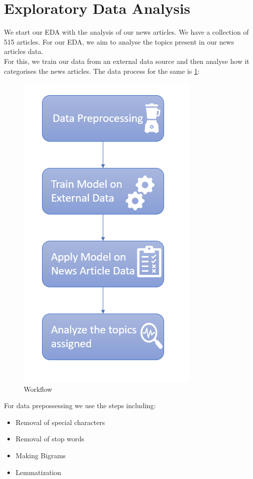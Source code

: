 \documentclass{article}
\begin{document}
\section{Exploratory Data Analysis}

We start our EDA with the analysis of our news articles. We have a collection of 515 articles. For our EDA, we aim to analyse the topics present in our news articles data. \\
 For this, we train our data from an external data source\cite{allnewsdata} and then analyse how it categorises the news articles. The data process for the same is \ref{Workflow}: \\

\begin{figure}
\centering
\includegraphics[scale=0.6]{lda_eda_process.PNG}
\caption{Workflow}
\label{Workflow}
\end{figure}

For data prepossessing we use the steps including:
\begin{itemize}
\item Removal of special characters
\item Removal of stop words
\item Making Bigrams 
\item Lemmatization
\end{itemize}
\end{document}
